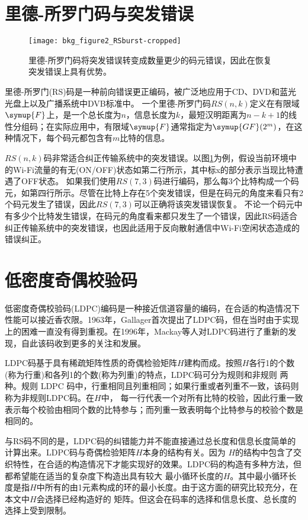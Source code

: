 \section{里德-所罗门码与突发错误}
\begin{figure}
	\centering
	\texttt{[image: bkg\_figure2\_RSburst-cropped]}
	\caption{里德-所罗门码将突发错误转变成数量更少的码元错误，因此在恢复突发错误上具有优势。}
	\label{fig:rscode}
\end{figure}
里德-所罗门(RS)码是一种前向错误更正编码，被广泛地应用于CD、DVD和蓝光光盘上以及广播系统中DVB标准中。 
一个里德-所罗门码$RS(n,k)$定义在有限域$\symup{F}$上，是一个总长度为$n$，信息长度为$k$，最短汉明距离为$n-k+1$的线性分组码；在实际应用中，有限域$\symup{F}$通常指定为$\symup{GF}(2^m)$，在这种情况下，每个码元都包含有$m$比特的信息。

$RS(n,k)$码非常适合纠正传输系统中的突发错误。以图\ref{fig:rscode}为例，假设当前环境中的Wi-Fi流量的有无(ON/OFF)状态如第二行所示，其中标x的部分表示当现比特遭遇了OFF状态。
如果我们使用$RS(7,3)$码进行编码，那么每3个比特构成一个码元，如第四行所示。尽管在比特上存在5个突发错误，但是在码元的角度来看只有2个码元发生了错误，因此$RS(7,3)$可以正确将该突发错误恢复。
不论一个码元中有多少个比特发生错误，在码元的角度看来都只发生了一个错误，因此RS码适合纠正传输系统中的突发错误，也因此适用于反向散射通信中Wi-Fi空闲状态造成的错误纠正。
\section{低密度奇偶校验码}

低密度奇偶校验码(LDPC)编码是一种接近信道容量的编码，在合适的构造情况下性能可以接近香农限。1963年，Gallager首次提出了LDPC码，但在当时由于实现上的困难一直没有得到重视。在1996年，Mackay等人对LDPC码进行了重新的发现，自此该码收到更多的关注和发展。

LDPC码基于具有稀疏矩阵性质的奇偶检验矩阵$H$建构而成。按照$H$各行1的个数(称为行重)和各列1的个数(称为列重)的特点，LDPC码可分为规则和非规则
两种。规则 LDPC 码中，行重相同且列重相同；如果行重或者列重不一致，该码则称为非规则LDPC码。在$H$中，
每一行代表一个对所有比特的校验，因此行重一致表示每个校验由相同个数的比特参与；而列重一致表明每个比特参与的校验个数是相同的。

与RS码不同的是，LDPC码的纠错能力并不能直接通过总长度和信息长度简单的计算出来。LDPC码与奇偶检验矩阵$H$本身的结构有关。因为
$H$的结构中包含了交织特性，在合适的构造情况下才能实现好的效果。LDPC码的构造有多种方法，但都希望能在适当的复杂度下构造出具有较大
最小循环长度的$H$。其中最小循环长度是指$H$中所有的由1元素构成的环的最小长度。由于这方面的研究比较充分，在本文中$H$会选择已经构造好的
矩阵。但这会在码率的选择和信息长度、总长度的选择上受到限制。